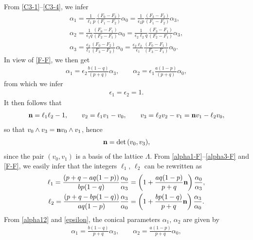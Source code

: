 \documentclass[10pt,a4paper]{amsart}
\numberwithin{equation}{section}
\begin{document}
From \eqref{C3-1}--\eqref{C3-4}, we infer
\begin{gather} \alpha _1 = \frac{1}{\ell _1 p} \frac{(F_0 - F_2)}{(F_1 - F_2)} \alpha _0 = \frac{1}{\epsilon _2 p} \frac{(F_3 - F_2)}{(F_1 - F_2)} \alpha _3, \label{alpha1-F}\\
\alpha _2 = \frac{1}{\epsilon _1 q} \frac{(F_0 - F_1)}{(F_2 - F_1)} \alpha _0 = \frac{1}{\epsilon _2 \ell _2 q} \frac{(F_3 - F_1)}{(F_2 - F_1)} \alpha _3, \label{alpha2-F} \\
\alpha _3 = \frac{\epsilon _2}{\ell _1} \frac{(F_0- F_2)}{(F_3 - F_2)} \alpha _0 = \frac{\epsilon _2 \ell _2}{\epsilon _1} \frac{(F_0- F_1)}{(F_3 - F_1)} \alpha _0. \label{alpha3-F}\end{gather}
In view of \eqref{F-F}, we then get
\begin{gather} \label{alpha12} \alpha _1 = \epsilon _2 \frac{b (1 - q)}{(p + q)} \alpha _3, \qquad \alpha _2 =
\epsilon _1 \frac{a (1 - p)}{(p + q)} \alpha _0, \end{gather}
from which we infer
\begin{gather} \label{epsilon} \epsilon _1 = \epsilon _2 = 1. \end{gather}
It then follows that
\begin{gather} {\bf n} = \ell _1 \ell _2 - 1,\qquad
v _2 = \ell _1 v _1 - v _0, \qquad v_3 = \ell _2 v_2 - v_1 = {\bf n} v_1 - \ell _2 v _0, \label{v2v3}\end{gather}
so that $v _0 \wedge v _3 = {\bf n} v _0 \wedge v _1$, hence
\[ {\bf n} = \det{(v_0, v _3)}, \]
 since the pair $(v_0, v_1)$ is a basis of the lattice $\Lambda$.
From \eqref{alpha1-F}--\eqref{alpha3-F} and \eqref{F-F}, we easily infer that the integers $\ell _1$, $\ell _2$ can be rewritten as
\begin{gather} \ell _1 = \frac{(p + q - a q (1 - p))}{b p (1 - q)} \frac{\alpha _0}{\alpha _3} = \left(1 + \frac{a q (1 - p)}{p + q} {\bf n}\right) \frac{\alpha _0}{\alpha _3},\label{ell1-def} \\
\ell _2 = \frac{(p + q - b p (1 - q))}{a q (1 - p)} \frac{\alpha _3}{\alpha _0} = \left(1 + \frac{b p (1 - q)}{p + q} {\bf n}\right) \frac{\alpha _3}{\alpha _0}.\label{ell2-def} \end{gather}
From \eqref{alpha12} and \eqref{epsilon}, the conical parameters $\alpha _1$, $\alpha _2$ are given by
\begin{gather} \label{alpha12-def} \alpha _1 = \frac{b (1 - q)}{p + q} \alpha _3, \qquad
 \alpha _2 = \frac{a (1 - p)}{p + q} \alpha _0, \end{gather}
\end{document}
